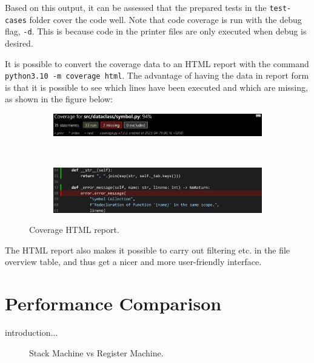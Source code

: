 Based on this output, it can be assessed that the prepared tests in the \texttt{test-cases} folder cover the code well. Note that code coverage is run with the debug flag, \texttt{-d}. This is because code in the printer files are only executed when debug is desired.

It is possible to convert the coverage data to an HTML report with the command \texttt{python3.10 -m coverage html}. The advantage of having the data in report form is that it is possible to see which lines have been executed and which are missing, as shown in the figure below: 

\begin{figure}[H]
    \centering
    \begin{subfigure}{1\textwidth}
        \centering
        \includegraphics[width=1\textwidth]{misc/images/Coverage_Panel.png}
        \end{subfigure}\\
        \begin{subfigure}{1\textwidth}
        \centering
        \includegraphics[width=1\textwidth]{misc/images/Coverage_Info.png}
        \end{subfigure}
    \caption{Coverage HTML report.}
\end{figure}

The HTML report also makes it possible to carry out filtering etc. in the file overview table, and thus get a nicer and more user-friendly interface.

\chapter{Performance Comparison}
introduction...

\begin{figure}[H]
    \centering
    \caption{Stack Machine vs Register Machine.}
\end{figure}

\newpage

